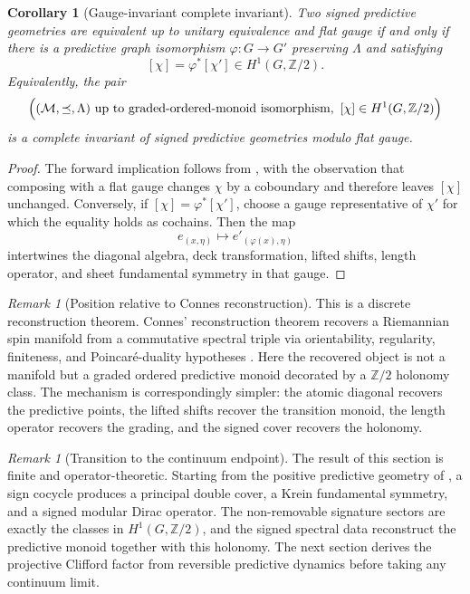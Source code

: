 \documentclass[11pt]{article}
\newtheorem{corollary}[theorem]{Corollary}
\theoremstyle{definition}
\theoremstyle{remark}
\newtheorem{remark}[theorem]{Remark}
\newcommand{\Z}{\mathbb{Z}}
\newcommand{\M}{\mathcal{M}}
\begin{document}
\begin{corollary}[Gauge-invariant complete invariant]
\label{cor:iff}
Two signed predictive geometries are equivalent up to unitary equivalence and
flat gauge if and only if there is a predictive graph isomorphism
$\varphi:G\to G'$ preserving $\Lambda$ and satisfying
\[
  [\chi]=\varphi^*[\chi']\in H^1(G,\Z/2).
\]
Equivalently, the pair
\[
  \Bigl((\M,\preceq,\Lambda)\ \text{up to graded-ordered-monoid isomorphism},
  \ [\chi]\in H^1(G,\Z/2)\Bigr)
\]
is a complete invariant of signed predictive geometries modulo flat gauge.
\end{corollary}

\begin{proof}
The forward implication follows from , with the
observation that composing with a flat gauge changes $\chi$ by a coboundary and
therefore leaves $[\chi]$ unchanged.  Conversely, if
$[\chi]=\varphi^*[\chi']$, choose a gauge representative of $\chi'$ for which
the equality holds as cochains.  Then the map
\[
  e_{(x,\eta)}\longmapsto e'_{(\varphi(x),\eta)}
\]
intertwines the diagonal algebra, deck transformation, lifted shifts, length
operator, and sheet fundamental symmetry in that gauge.
\end{proof}

\begin{remark}[Position relative to Connes reconstruction]
\label{rem:vs-connes}
This is a discrete reconstruction theorem.  Connes' reconstruction theorem
recovers a Riemannian spin manifold from a commutative spectral triple via
orientability, regularity, finiteness, and Poincar\'e-duality hypotheses
\cite{connesreconstruction}.  Here the recovered object is not a manifold but a
graded ordered predictive monoid decorated by a $\Z/2$ holonomy class.  The
mechanism is correspondingly simpler: the atomic diagonal recovers the
predictive points, the lifted shifts recover the transition monoid, the length
operator recovers the grading, and the signed cover recovers the holonomy.
\end{remark}

\begin{remark}[Transition to the continuum endpoint]
\label{rem:signed-transition}
The result of this section is finite and operator-theoretic.  Starting from the
positive predictive geometry of , a sign cocycle produces a
principal double cover, a Krein fundamental symmetry, and a signed modular
Dirac operator.  The non-removable signature sectors are exactly the classes in
$H^1(G,\Z/2)$, and the signed spectral data reconstruct the predictive monoid
together with this holonomy.  The next section derives the projective Clifford factor from reversible
predictive dynamics before taking any continuum limit.
\end{remark}
\end{document}
